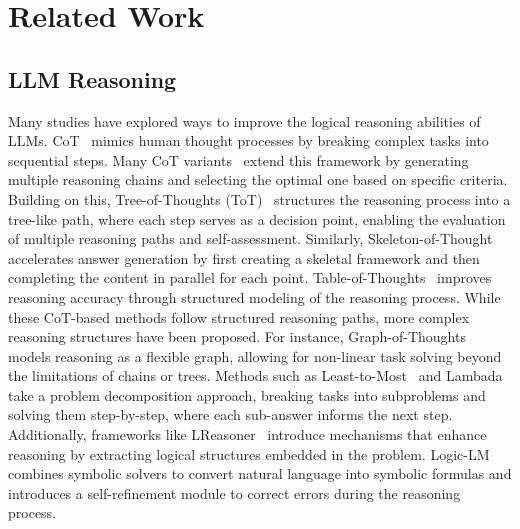 \section{Related Work}
\label{sec:related-work}

\subsection{LLM Reasoning}
%
Many studies have explored ways to improve the logical reasoning abilities of LLMs. CoT~\citep{wei2023chainofthought} mimics human thought processes by breaking complex tasks into sequential steps.
%
Many CoT variants~\citep{eric2022star,wang2023selfconsistency, shum2023automatic} extend this framework by generating multiple reasoning chains and selecting the optimal one based on specific criteria.
%
Building on this, Tree-of-Thoughts (ToT)~\citep{yao2024tree} structures the reasoning process into a tree-like path, where each step serves as a decision point, enabling the evaluation of multiple reasoning paths and self-assessment. 
%
Similarly, Skeleton-of-Thought~\citep{ning2023skeleton} accelerates answer generation by first creating a skeletal framework and then completing the content in parallel for each point. 
Table-of-Thoughts~\citep{jin2023tab} improves reasoning accuracy through structured modeling of the reasoning process.
%
While these CoT-based methods follow structured reasoning paths, more complex reasoning structures have been proposed. For instance, Graph-of-Thoughts~\citep{besta2024graph} models reasoning as a flexible graph, allowing for non-linear task solving beyond the limitations of chains or trees. Methods such as Least-to-Most~\citep{zhou2022least} and Lambada~\citep{kazemi2022lambada} take a problem decomposition approach, breaking tasks into subproblems and solving them step-by-step, where each sub-answer informs the next step.
%
Additionally, frameworks like LReasoner~\citep{wang2021logic} introduce mechanisms that enhance reasoning by extracting logical structures embedded in the problem. Logic-LM~\citep{pan2023logic} combines symbolic solvers to convert natural language into symbolic formulas and introduces a self-refinement module to correct errors during the reasoning process. 
%
